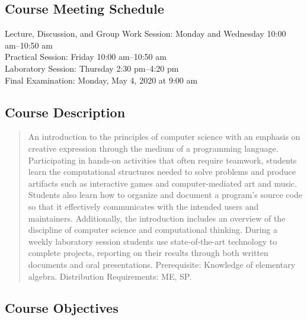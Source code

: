 \documentclass[11pt]{article}
\begin{document}
\subsection*{Course Meeting Schedule}

Lecture, Discussion, and Group Work Session: Monday and Wednesday 10:00 am--10:50 am \\
Practical Session: Friday 10:00 am--10:50 am \\
Laboratory Session: Thursday 2:30 pm--4:20 pm \\
Final Examination: Monday, May 4, 2020 at 9:00 am

\subsection*{Course Description}

\begin{quote}

An introduction to the principles of computer science with an emphasis on
creative expression through the medium of a programming language. Participating
in hands-on activities that often require teamwork, students learn the
computational structures needed to solve problems and produce artifacts such as
interactive games and computer-mediated art and music. Students also learn how
to organize and document a program's source code so that it effectively
communicates with the intended users and maintainers. Additionally, the
introduction includes an overview of the discipline of computer science and
computational thinking. During a weekly laboratory session students use
state-of-the-art technology to complete projects, reporting on their results
through both written documents and oral presentations.
Prerequisite: Knowledge of elementary algebra.
Distribution Requirements: ME, SP.\@ \\

\end{quote}

\subsection*{Course Objectives}
\end{document}
